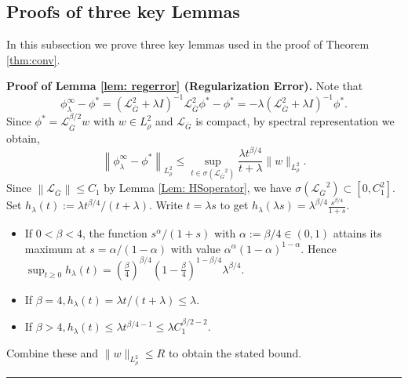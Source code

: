 \documentclass[12pt]{article}
\def\Gbar{ {\overline{G}} }
\def\LGbar{ {\mathcal{L}_{\overline{G}}}  }
\newenvironment{proof}[1][Proof]{\noindent\textbf{#1.} }{\ \rule{0.5em}{0.5em}}
\numberwithin{equation}{section}
\numberwithin{theorem}{section}
\begin{document}
\subsection{Proofs of three key Lemmas}\label{sec:tech_lemmas}
In this subsection we prove three key lemmas used in the proof of Theorem \ref{thm:conv}.

\begin{proof}[Proof of Lemma \ref{lem: regerror} (Regularization Error)] Note that 
\begin{equation}
\label{eq:diffphireg}
{\phi}_\lambda^{\infty}-\phi^*=\left(\mathcal{L}_{\Gbar}^2+\lambda I\right)^{-1} \mathcal{L}_{\Gbar}^2 \phi^*-\phi^*=-\lambda\left(\mathcal{L}_{\Gbar}^2+\lambda I\right)^{-1} \phi^*. 
\end{equation}
Since $\phi^*=\mathcal{L}_{\Gbar}^{\beta / 2} w$ with $w \in L_\rho^2$ and  $\LGbar$ is compact, by spectral representation we obtain,
$$
\left\|{\phi}_\lambda^{\infty}-\phi^*\right\|_{L_\rho^2} \leq \sup _{t \in \sigma(\LGbar^2)} \frac{\lambda t^{\beta / 4}}{t+\lambda}\|w\|_{L_\rho^2} .
$$
Since $\left\|\mathcal{L}_{\Gbar}\right\| \leq C_1$ by Lemma \ref{Lem: HSoperator}, we have $\sigma(\LGbar^2) \subset\left[0, C_1^2\right]$. 
Set $h_\lambda(t):=\lambda t^{\beta / 4} /(t+\lambda)$. Write $t=\lambda s$ to get
$
h_\lambda(\lambda s)=\lambda^{\beta / 4} \frac{s^{\beta / 4}}{1+s}$. 
\begin{itemize}
    \item If $0<\beta<4$, the function $s^\alpha /(1+s)$ with $\alpha:=\beta / 4 \in(0,1)$ attains its maximum at $s= \alpha /(1-\alpha)$ with value $\alpha^\alpha(1-\alpha)^{1-\alpha}$. Hence
$
\sup _{t \geq 0} h_\lambda(t)=\left(\frac{\beta}{4}\right)^{\beta / 4}\left(1-\frac{\beta}{4}\right)^{1-\beta / 4} \lambda^{\beta / 4} $. 
\item If $\beta=4, h_\lambda(t)=\lambda t /(t+\lambda) \leq \lambda$.
\item If $\beta>4, h_\lambda(t) \leq \lambda t^{\beta/4-1} \leq \lambda C_1^{\beta / 2-2}$.
\end{itemize}
Combine these and $\|w\|_{L_\rho^2} \leq R$ to obtain the stated bound.
\end{proof}
\end{document}
